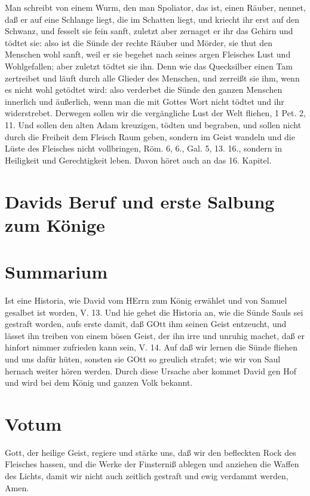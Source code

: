 Man schreibt von einem Wurm, den man Spoliator, das ist, einen Räuber, nennet, daß er auf eine Schlange liegt, die im Schatten liegt, und kriecht ihr erst auf den Schwanz, und fesselt sie fein sanft, zuletzt aber zernaget er ihr das Gehirn und tödtet sie: also ist die Sünde der rechte Räuber und Mörder, sie thut den Menschen wohl sanft, weil er sie begehet nach seines argen Fleisches Lust und Wohlgefallen; aber zuletzt tödtet sie ihn. Denn wie das Quecksilber einen Tam zertreibet und läuft durch alle Glieder des Menschen, und zerreißt sie ihm, wenn es nicht wohl getödtet wird: also verderbet die Sünde den ganzen Menschen innerlich und äußerlich, wenn man die mit Gottes Wort nicht tödtet und ihr widerstrebet. Derwegen sollen wir die vergängliche Lust der Welt fliehen, 1 Pet. 2, 11. Und sollen den alten Adam kreuzigen, tödten und begraben, und sollen nicht durch die Freiheit dem Fleisch Raum geben, sondern im Geist wandeln und die Lüste des Fleisches nicht vollbringen, Röm. 6, 6., Gal. 5, 13. 16., sondern in Heiligkeit und Gerechtigkeit leben. Davon höret auch an das 16. Kapitel.

\section{Davids Beruf und erste Salbung zum Könige}

\section{Summarium}

Ist eine Historia, wie David vom HErrn zum König erwählet und von Samuel gesalbet ist worden, V. 13. Und hie gehet die Historia an, wie die Sünde Sauls sei gestraft worden, aufs erste damit, daß GOtt ihm seinen Geist entzeucht, und lässet ihn treiben von einem bösen Geist, der ihn irre und unruhig machet, daß er hinfort nimmer zufrieden kann sein, V. 14. Auf daß wir lernen die Sünde fliehen und uns dafür hüten, sonsten sie GOtt so greulich strafet; wie wir von Saul hernach weiter hören werden. Durch diese Ursache aber kommet David gen Hof und wird bei dem König und ganzen Volk bekannt.

\section{Votum}

Gott, der heilige Geist, regiere und stärke uns, daß wir den befleckten Rock des Fleisches hassen, und die Werke der Finsterniß ablegen und anziehen die Waffen des Lichts, damit wir nicht auch zeitlich gestraft und ewig verdammt werden, Amen.

